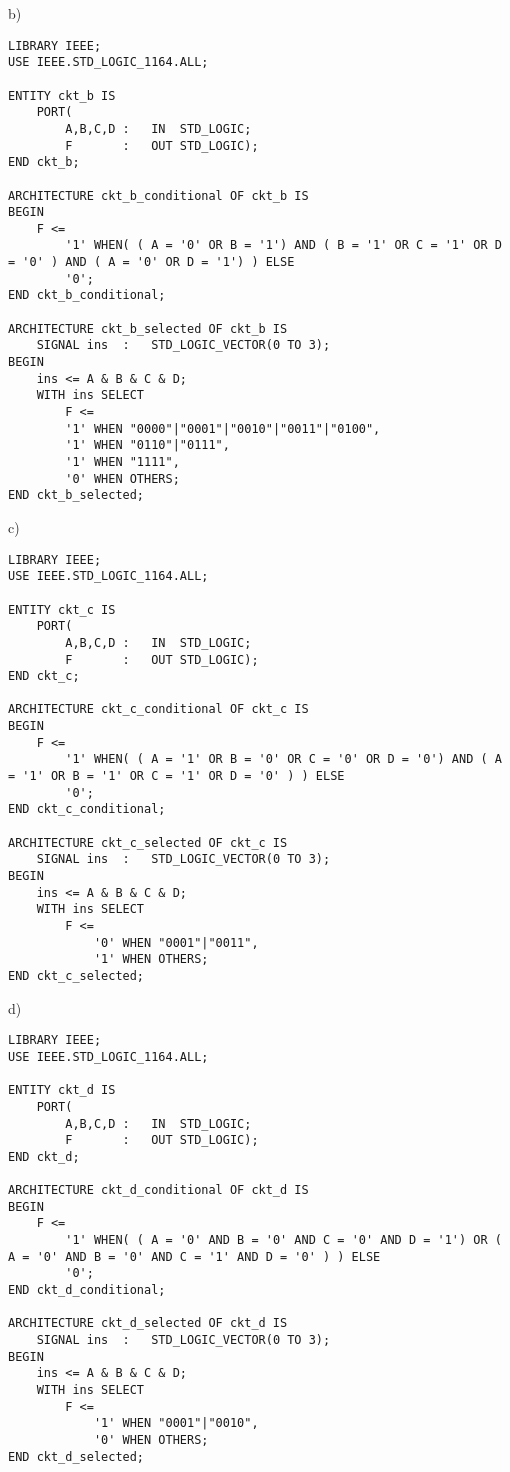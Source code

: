 \begin{enumerate}
	\begin{minipage}{1\linewidth}
		b)
		\begin{lstlisting}
LIBRARY IEEE;
USE IEEE.STD_LOGIC_1164.ALL;

ENTITY ckt_b IS
	PORT(
		A,B,C,D	:	IN	STD_LOGIC;
		F		:	OUT	STD_LOGIC);
END ckt_b;

ARCHITECTURE ckt_b_conditional OF ckt_b IS
BEGIN
	F <=
		'1' WHEN( ( A = '0' OR B = '1') AND ( B = '1' OR C = '1' OR D = '0' ) AND ( A = '0' OR D = '1') ) ELSE
		'0';
END ckt_b_conditional;

ARCHITECTURE ckt_b_selected OF ckt_b IS
	SIGNAL ins	:	STD_LOGIC_VECTOR(0 TO 3);
BEGIN
	ins <= A & B & C & D;
	WITH ins SELECT
		F <=
		'1' WHEN "0000"|"0001"|"0010"|"0011"|"0100",
		'1' WHEN "0110"|"0111",
		'1' WHEN "1111",
		'0' WHEN OTHERS;
END ckt_b_selected;
		\end{lstlisting}
	\end{minipage}

	\begin{minipage}{1\linewidth}
		c)
		\begin{lstlisting}
LIBRARY IEEE;
USE IEEE.STD_LOGIC_1164.ALL;

ENTITY ckt_c IS
	PORT(
		A,B,C,D	:	IN	STD_LOGIC;
		F		:	OUT	STD_LOGIC);
END ckt_c;

ARCHITECTURE ckt_c_conditional OF ckt_c IS
BEGIN
	F <=
		'1' WHEN( ( A = '1' OR B = '0' OR C = '0' OR D = '0') AND ( A = '1' OR B = '1' OR C = '1' OR D = '0' ) ) ELSE
		'0';
END ckt_c_conditional;

ARCHITECTURE ckt_c_selected OF ckt_c IS
	SIGNAL ins	:	STD_LOGIC_VECTOR(0 TO 3);
BEGIN
	ins <= A & B & C & D;
	WITH ins SELECT
		F <=
			'0' WHEN "0001"|"0011",
			'1' WHEN OTHERS;
END ckt_c_selected;
		\end{lstlisting}
	\end{minipage}

	\begin{minipage}{1\linewidth}
		d)
		\begin{lstlisting}
LIBRARY IEEE;
USE IEEE.STD_LOGIC_1164.ALL;

ENTITY ckt_d IS
	PORT(
		A,B,C,D	:	IN	STD_LOGIC;
		F		:	OUT	STD_LOGIC);
END ckt_d;

ARCHITECTURE ckt_d_conditional OF ckt_d IS
BEGIN
	F <=
		'1' WHEN( ( A = '0' AND B = '0' AND C = '0' AND D = '1') OR ( A = '0' AND B = '0' AND C = '1' AND D = '0' ) ) ELSE
		'0';
END ckt_d_conditional;

ARCHITECTURE ckt_d_selected OF ckt_d IS
	SIGNAL ins	:	STD_LOGIC_VECTOR(0 TO 3);
BEGIN
	ins <= A & B & C & D;
	WITH ins SELECT
		F <=
			'1' WHEN "0001"|"0010",
			'0' WHEN OTHERS;
END ckt_d_selected;
		\end{lstlisting}
	\end{minipage}
	

\end{enumerate}
